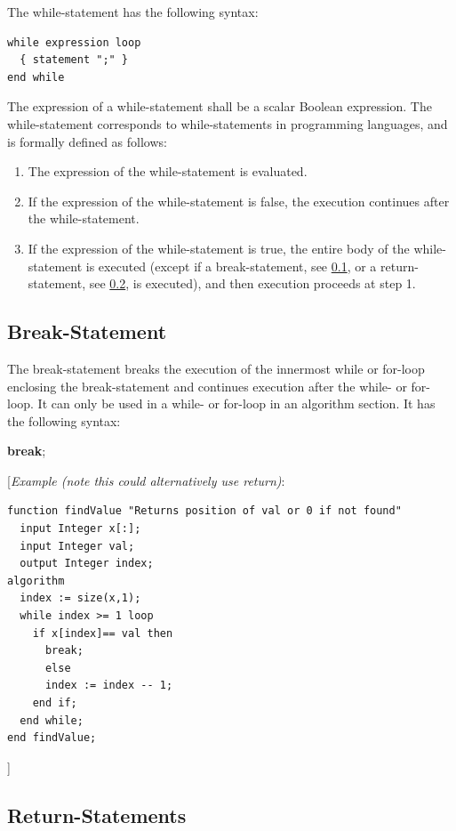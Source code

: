\documentclass[10pt,a4paper]{report}
\def\doublelabel#1{\label{#1}}
\begin{document}
The while-statement has the following syntax:

\begin{lstlisting}[language=grammar]
while expression loop
  { statement ";" }
end while
\end{lstlisting}
The expression of a while-statement shall be a scalar Boolean
expression. The while-statement corresponds to while-statements in
programming languages, and is formally defined as follows:
\begin{enumerate}
\item The expression of the while-statement is evaluated.
\item If the expression of the while-statement is false, the execution
continues after the while-statement.
\item If the expression of the while-statement is true, the entire body of
the while-statement is executed (except if a break-statement, see
\ref{break-statement}, or a return-statement, see \ref{return-statements}, is executed),
and then execution proceeds at step 1.
\end{enumerate}

\subsection{Break-Statement}\doublelabel{break-statement}

The break-statement breaks the execution of the innermost while or
for-loop enclosing the break-statement and continues execution after the
while- or for-loop. It can only be used in a while- or for-loop in an
algorithm section. It has the following syntax:

\textbf{break};

{[}\emph{Example (note this could alternatively use return)}:

\begin{lstlisting}[language=modelica]
function findValue "Returns position of val or 0 if not found"
  input Integer x[:];
  input Integer val;
  output Integer index;
algorithm
  index := size(x,1);
  while index >= 1 loop 
    if x[index]== val then
      break;
      else
      index := index -- 1;
    end if;
  end while;
end findValue;
\end{lstlisting}
{]}

\subsection{Return-Statements}\doublelabel{return-statements}
\end{document}
